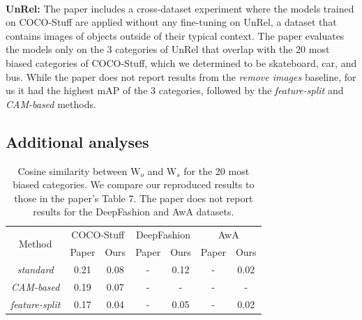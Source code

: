 \\
\textbf{UnRel:} The paper includes a cross-dataset experiment where the models trained on COCO-Stuff are applied without any fine-tuning on UnRel, a dataset that contains images of objects outside of their typical context. The paper evaluates the models only on the 3 categories of UnRel that overlap with the 20 most biased categories of COCO-Stuff, which we determined to be skateboard, car, and bus. While the paper does not report results from the \textit{remove images} baseline, for us it had the highest mAP of the 3 categories, followed by the \textit{feature-split} and \textit{CAM-based} methods.


\subsection{Additional analyses}
\label{sec:addanalyses}

\begin{table}[b!]
\centering
\begin{tabular}{|c|cc|cc|cc|}
\hline
\multirow{2}{*}{Method} & \multicolumn{2}{c|}{COCO-Stuff} & \multicolumn{2}{c|}{DeepFashion} & \multicolumn{2}{c|}{AwA} \\
\cline{2-7}
 & Paper & Ours & Paper & Ours & Paper & Ours \\
\hline
\textit{standard}      & 0.21 & 0.08  & - & 0.12 & - & 0.02\\
\textit{CAM-based}     & 0.19 & 0.07  & - & -& - & -\\
\textit{feature-split} & 0.17 & 0.04 & - & 0.05 & - & 0.02\\ \hline
\end{tabular}
\caption{Cosine similarity between $\mathrm{W}_o$ and $\mathrm{W}_s$ for the 20 most biased categories. We compare our reproduced results to those in the paper's Table 7. The paper does not report results for the DeepFashion and AwA datasets.}
\label{tab:cosinesimilarity}
\end{table}


